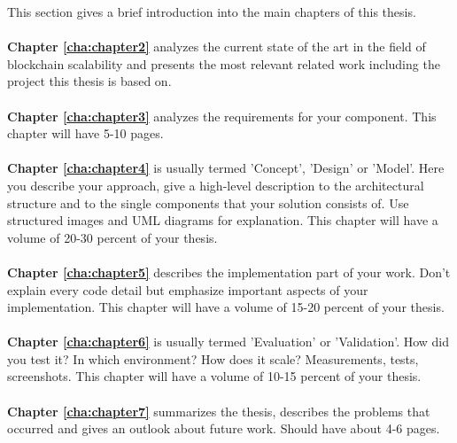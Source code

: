 This section gives a brief introduction into the main chapters of this thesis. 
\\
\\
\textbf{Chapter \ref{cha:chapter2}} analyzes the current state of the art in the field of blockchain scalability and presents the most relevant related work including the project this thesis is based on.
\\
\\
\textbf{Chapter \ref{cha:chapter3}} analyzes the requirements for your component. This chapter will have 5-10 pages.
\\
\\
\textbf{Chapter \ref{cha:chapter4}} is usually termed 'Concept', 'Design' or 'Model'. Here you describe your approach, give a high-level description to the architectural structure and to the single components that your solution consists of. Use structured images and UML diagrams for explanation. This chapter will have a volume of 20-30 percent of your thesis.
\\
\\
\textbf{Chapter \ref{cha:chapter5}} describes the implementation part of your work. Don't explain every code detail but emphasize important aspects of your implementation. This chapter will have a volume of 15-20 percent of your thesis.
\\
\\
\textbf{Chapter \ref{cha:chapter6}} is usually termed 'Evaluation' or 'Validation'. How did you test it? In which environment? How does it scale? Measurements, tests, screenshots. This chapter will have a volume of 10-15 percent of your thesis.
\\
\\
\textbf{Chapter \ref{cha:chapter7}} summarizes the thesis, describes the problems that occurred and gives an outlook about future work. Should have about 4-6 pages.
